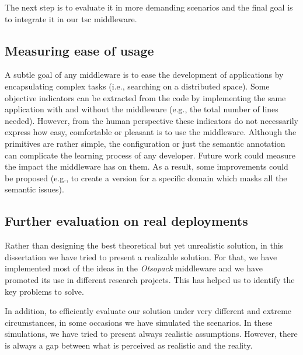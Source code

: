 The next step is to evaluate it in more demanding scenarios and the final goal is to integrate it in our \ac{tsc} middleware.




\subsection{Measuring ease of usage}

A subtle goal of any middleware is to ease the development of applications by encapsulating complex tasks (i.e., searching on a distributed space).
Some objective indicators can be extracted from the code by implementing the same application with and without the middleware (e.g., the total number of lines needed).
However, from the human perspective these indicators do not necessarily express how easy, comfortable or pleasant is to use the middleware.
Although the primitives are rather simple, the configuration or just the semantic annotation can complicate the learning process of any developer.
Future work could measure the impact the middleware has on them.
As a result, some improvements could be proposed (e.g., to create a version for a specific domain which masks all the semantic issues).


\subsection{Further evaluation on real deployments}

Rather than designing the best theoretical but yet unrealistic solution, in this dissertation we have tried to present a realizable solution.
For that, we have implemented most of the ideas in the \emph{Otsopack} middleware and we have promoted its use in different research projects.
This has helped us to identify the key problems to solve.

In addition, to efficiently evaluate our solution under very different and extreme circumstances, in some occasions we have simulated the scenarios. %
In these simulations, we have tried to present always realistic assumptions.
However, there is always a gap between what is perceived as realistic and the reality.

